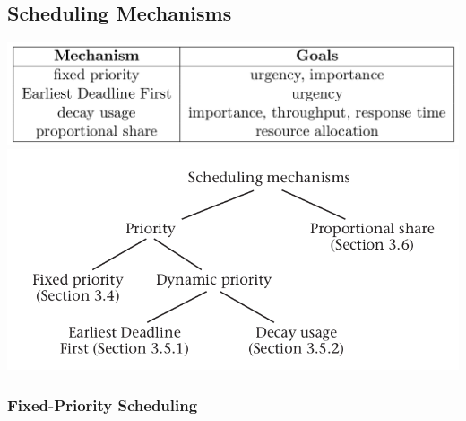 \documentclass[11pt]{article}
\makeatletter
\def\maxwidth{\ifdim\Gin@nat@width>\linewidth\linewidth
    \else\Gin@nat@width\fi}
\let\Oldincludegraphics\includegraphics
\renewcommand{\includegraphics}[1]{\Oldincludegraphics[width=.8\maxwidth]{#1}}
\makeatother
\begin{document}
    \subsection{Scheduling Mechanisms}\label{scheduling-mechanisms}

\includegraphics{img/scheduling_mechanisms_goals.png}
\includegraphics{img/scheduling_mechanisms.png}

    \subsubsection{Fixed-Priority
Scheduling}\label{fixed-priority-scheduling}
\end{document}
